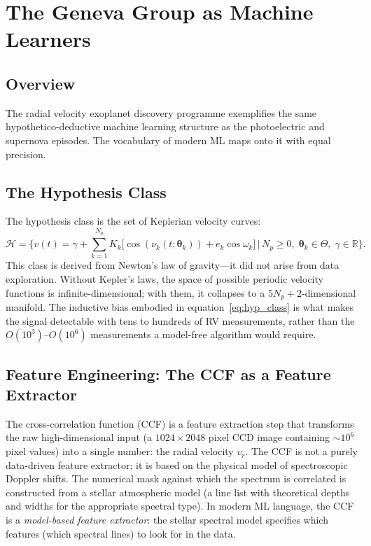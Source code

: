 \documentclass[12pt]{article}
\begin{document}
\section{The Geneva Group as Machine Learners}
\label{sec:ml}

\subsection{Overview}

The radial velocity exoplanet discovery programme exemplifies the same
hypothetico-deductive machine learning structure as the photoelectric
and supernova episodes.  The vocabulary of modern ML maps onto it with
equal precision.

\subsection{The Hypothesis Class}

The hypothesis class is the set of Keplerian velocity curves:
\begin{equation}\label{eq:hyp_class}
  \mathcal{H} = \Biggl\{
    v(t) = \gamma + \sum_{k=1}^{N_p}
      K_k\bigl[\cos(\nu_k(t;\boldsymbol\theta_k)) + e_k\cos\omega_k\bigr]
    \,\Bigg|\,
    N_p \geq 0,\;
    \boldsymbol\theta_k \in \Theta,\; \gamma \in \mathbb{R}
  \Biggr\}.
\end{equation}
This class is derived from Newton's law of gravity---it did not arise
from data exploration.  Without Kepler's laws, the space of possible
periodic velocity functions is infinite-dimensional; with them, it
collapses to a $5N_p + 2$-dimensional manifold.  The inductive bias
embodied in equation~\eqref{eq:hyp_class} is what makes the signal
detectable with tens to hundreds of RV measurements, rather than the
$O(10^3)$--$O(10^6)$ measurements a model-free algorithm would
require.

\subsection{Feature Engineering: The CCF as a Feature Extractor}

The cross-correlation function (CCF) is a feature extraction step
that transforms the raw high-dimensional input (a $1024\times 2048$
pixel CCD image containing $\sim 10^6$ pixel values) into a single
number: the radial velocity $v_r$.  The CCF is not a purely data-driven
feature extractor; it is based on the physical model of spectroscopic
Doppler shifts.  The numerical mask against which the spectrum is
correlated is constructed from a stellar atmospheric model (a line
list with theoretical depths and widths for the appropriate spectral
type).  In modern ML language, the CCF is a \emph{model-based feature
extractor}: the stellar spectral model specifies which features (which
spectral lines) to look for in the data.
\end{document}
